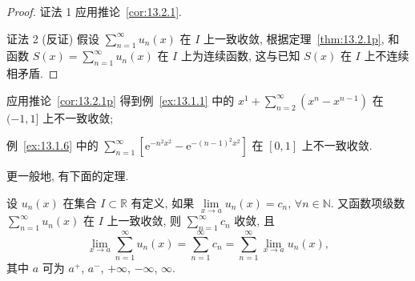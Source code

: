 \begin{proof}
证法 1 应用推论~\ref{cor:13.2.1}.

证法 2 (反证) 假设 $\sum_{n=1}^{\infty}u_{n}(x)$ 在 $I$ 上一致收敛, 根据定理~\ref{thm:13.2.1p}, 和函数 $S(x)=\sum_{n=1}^{\infty}u_{n}(x)$ 在 $I$ 上为连续函数, 这与已知 $S(x)$ 在 $I$ 上不连续相矛盾.
\end{proof}

应用推论~\ref{cor:13.2.1p} 得到例~\ref{ex:13.1.1} 中的 $x^{1}+\sum_{n=2}^{\infty}(x^{n}-x^{n-1})$ 在 $(-1,1]$ 上不一致收敛;

例~\ref{ex:13.1.6} 中的 $\sum_{n=1}^{\infty}[\mathrm{e}^{-n^{2}x^{2}}-\mathrm{e}^{-(n-1)^{2}x^{2}}]$ 在 $[0,1]$ 上不一致收敛.

更一般地, 有下面的定理.

\setcounter{theorem}{2}
\begin{theoremp}\label{thm:13.2.2p}
设 $u_{n}(x)$ 在集合 $I\subset\mathbb{R}$ 有定义, 如果 $\lim\limits_{x\to a}u_{n}(x)=c_{n}$, $\forall n\in\mathbb{N}$. 又函数项级数 $\sum_{n=1}^{\infty}u_{n}(x)$ 在 $I$ 上一致收敛, 则 $\sum_{n=1}^{\infty}c_{n}$ 收敛, 且
\[
  \lim_{x\to a}\sum_{n=1}^{\infty}u_{n}(x)=\sum_{n=1}^{\infty}c_{n}=\sum_{n=1}^{\infty}\lim_{x\to a}u_{n}(x),
\]
其中 $a$ 可为 $a^{+}$, $a^{-}$, $+\infty$, $-\infty$, $\infty$.
\end{theoremp}

